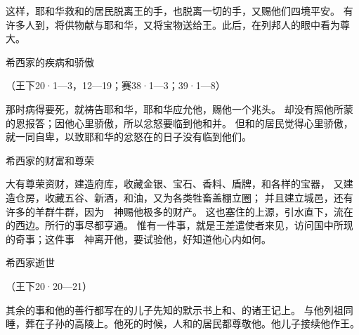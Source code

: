 {这样，耶和华救{}和{}的居民脱离{}王{}的手，也脱离一切{}的手，又赐他们四境平安。
有许多人到{}，将供物献与耶和华，又将宝物送给{}王{}。此后，{}在列邦人的眼中看为尊大。
\par }{\SH 希西家的疾病和骄傲
\par }{\R （王下20·1—3，12—19；赛38·1—3；39·1—8）
\par }{\PP {}那时{}病得要死，就祷告耶和华，耶和华应允他，赐他一个兆头。
却没有照他所蒙的恩报答{}；因他心里骄傲，所以忿怒要临到他和{}并{}。
但{}和{}的居民觉得心里骄傲，就一同自卑，以致耶和华的忿怒在{}的日子没有临到他们。
\par }{\SH 希西家的财富和尊荣
\par }{\PP {}大有尊荣资财，建造府库，收藏金银、宝石、香料、盾牌，和各样的宝器，
又建造仓房，收藏五谷、新酒，和油，又为各类牲畜盖棚立圈；
并且建立城邑，还有许多的羊群牛群，因为　神赐他极多的财产。
这{}也塞住{}的上源，引水直下，流在{}的西边。{}所行的事尽都亨通。
惟有一件事，就是{}王差遣使者来见{}，访问国中所现的奇事；这件事　神离开他，要试验他，好知道他心内如何。
\par }{\SH 希西家逝世
\par }{\R （王下20·20—21）
\par }{\PP {}其余的事和他的善行都写在{}的儿子先知{}的默示书上和{}、{}的诸王记上。
与他列祖同睡，葬在{}子孙的高陵上。他死的时候，{}人和{}的居民都尊敬他。他儿子{}接续他作王。

}
